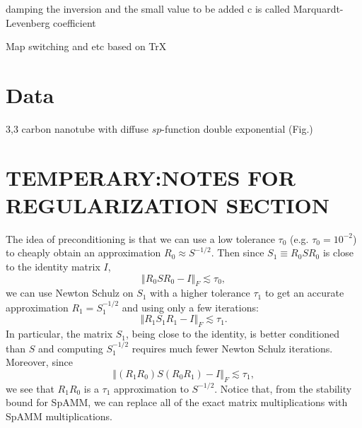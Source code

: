 \documentclass[letterpaper,twocolumn,amsmath,amsfont,amssymb,english,aps,jcp,preprintnumbers,groupaddress,nofootinbib,tightenlines,floatfix]{revtex4}
\theoremstyle{plain}
\theoremstyle{remark}
\theoremstyle{plain}
\begin{document}
damping the inversion and the small value to be added c is called Marquardt-Levenberg coefficient


Map switching and etc based on TrX

\section{Data} \label{data}

3,3 carbon nanotube with diffuse $sp$-function
double exponential (Fig.)


\section{TEMPERARY:NOTES FOR REGULARIZATION SECTION} 

The idea of preconditioning is that we can use a low tolerance $\tau_{0}$
(e.g. $\tau_{0}=10^{-2}$) to cheaply obtain an approximation $R_{0}\approx S^{-1/2}$.
Then since $S_{1}\equiv R_{0}SR_{0}$ is close to the identity matrix
$I$, 
\[
\left\Vert R_{0}SR_{0}-I\right\Vert _{F}\lesssim\tau_{0},
\]
we can use Newton Schulz on $S_{1}$ with a higher tolerance $\tau_{1}$
to get an accurate approximation $R_{1}=S_{1}^{-1/2}$ and using only
a few iterations:
\[
\left\Vert R_{1}S_{1}R_{1}-I\right\Vert _{F}\lesssim\tau_{1}.
\]
In particular, the matrix $S_{1}$, being close to the identity, is
better conditioned than $S$ and computing $S_{1}^{-1/2}$ requires
much fewer Newton Schulz iterations. Moreover, since 
\[
\left\Vert \left(R_{1}R_{0}\right)S\left(R_{0}R_{1}\right)-I\right\Vert _{F}\lesssim\tau_{1},
\]
we see that $R_{1}R_{0}$ is a $\tau_{1}$ approximation to $S^{-1/2}$.
Notice that, from the stability bound for SpAMM, we can replace all
of the exact matrix multiplications with SpAMM multiplications. 
\end{document}
